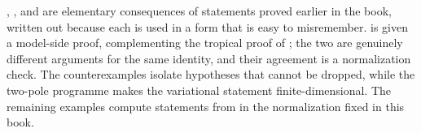 , ,
 and  are elementary
consequences of statements proved earlier in the book, written out because
each is used in a form that is easy to misremember.
 is given a model-side proof, complementing
the tropical proof of ; the two are genuinely
different arguments for the same identity, and their agreement is a
normalization check.  The counterexamples isolate hypotheses that cannot be
dropped, while the two-pole programme makes the variational statement
finite-dimensional.  The remaining examples compute statements from
\cite{BFJ15,BGJKK25,GJR26} in the normalization fixed in this book.

